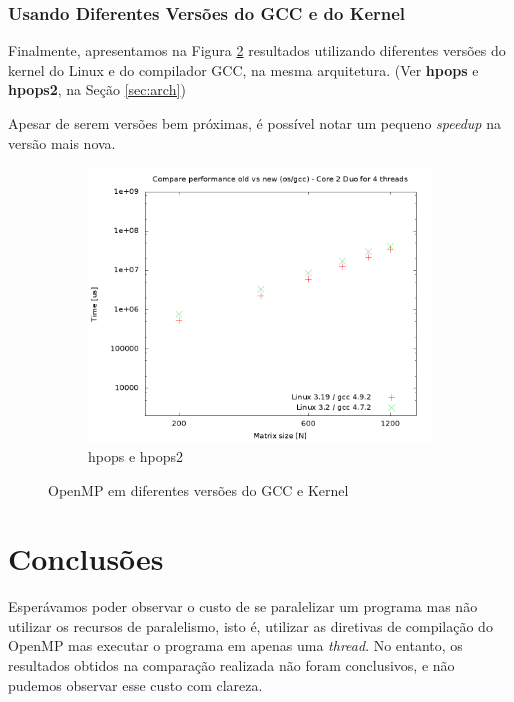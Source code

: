 \documentclass[a4paper, 12pt]{article}
\begin{document}
\subsubsection{Usando Diferentes Versões do GCC e do Kernel}

Finalmente, apresentamos na Figura \ref{fig:cmpv} resultados utilizando
diferentes versões do kernel do Linux e do compilador GCC, na mesma
arquitetura. (Ver \textbf{hpops} e \textbf{hpops2}, na Seção \ref{sec:arch})

Apesar de serem versões bem próximas, é possível notar um pequeno
\textit{speedup} na versão mais nova.

\begin{figure}[H]
    \centering
    \begin{subfigure}[H]{0.5\textwidth}
        \includegraphics[width=\textwidth]{compare_old_new_os}
        \caption{hpops e hpops2}
        \label{fig:hpops_hpops2}
    \end{subfigure}%
    \caption{OpenMP em diferentes versões do GCC e Kernel}\label{fig:cmpv}
\end{figure}

\newpage
\section{Conclusões} \label{sec:dis}

Esperávamos poder observar o custo de se paralelizar um programa
mas não utilizar os recursos de paralelismo, isto é,
utilizar as diretivas de compilação do OpenMP mas
executar o programa em apenas uma \textit{thread}. No entanto,
os resultados obtidos na comparação realizada não foram conclusivos,
e não pudemos observar esse custo com clareza.
\end{document}
